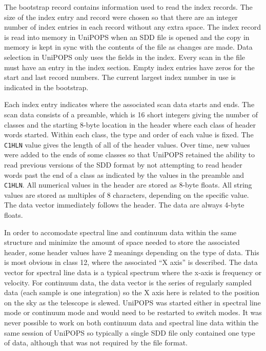 \documentclass[final,authoryear,5p,times,twocolumn]{elsarticle}
\begin{document}
The bootstrap record contains information used to read the index
records.  The size of the index entry and record were chosen so that
there are an integer number of index entries in each record without
any extra space.  The index record is read into memory in UniPOPS when
an SDD file is opened and the copy in memory is kept in sync with the
contents of the file as changes are made.  Data selection in UniPOPS
only uses the fields in the index.  Every scan in the file must have
an entry in the index section.  Empty index entries have zeros for the
start and last record numbers.  The current largest index number in
use is indicated in the bootstrap.

Each index entry indicates where the associated scan data starts and
ends.  The scan data consists of a preamble, which is 16 short
integers giving the number of classes and the starting 8-byte location
in the header where each class of header words started.  Within each
class, the type and order of each value is fixed.  The \texttt{C1HLN}
value gives the length of all of the header values.  Over time, new
values were added to the ends of some classes so that UniPOPS retained
the ability to read previous versions of the SDD format by not
attempting to read header words past the end of a class as indicated
by the values in the preamble and \texttt{C1HLN}.  All numerical
values in the header are stored as 8-byte floats.  All string values
are stored as multiples of 8 characters, depending on the specific
value.  The data vector immediately follows the header.  The data are
always 4-byte floats.

In order to accomodate spectral line and continuum data within the
same structure and minimize the amount of space needed to store the
associated header, some header values have 2 meanings depending on the
type of data.  This is most obvious in class 12, where the associated
``X axis'' is described.  The data vector for spectral line data is a
typical spectrum where the x-axis is frequency or velocity.  For
continuum data, the data vector is the series of regularly sampled
data (each sample is one integration) so the X axis here is related to
the position on the sky as the telescope is slewed.  UniPOPS was
started either in spectral line mode or continuum mode and would need
to be restarted to switch modes.  It was never possible to work on
both continuum data and spectral line data within the same session of
UniPOPS so typically a single SDD file only contained one type of
data, although that was not required by the file format.
\end{document}
